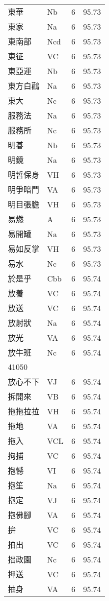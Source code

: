 \documentclass[twocolumn]{book}
\begin{document}
\begin{supertabular}{llrr}
東華 & Nb & 6 &  95.73\\
東家 & Na & 6 &  95.73\\
東南部 & Ncd & 6 &  95.73\\
東征 & VC & 6 &  95.73\\
東亞運 & Nb & 6 &  95.73\\
東方白鸛 & Na & 6 &  95.73\\
東大 & Nc & 6 &  95.73\\
服務法 & Na & 6 &  95.73\\
服務所 & Nc & 6 &  95.73\\
明碁 & Nb & 6 &  95.73\\
明鏡 & Na & 6 &  95.73\\
明哲保身 & VH & 6 &  95.73\\
明爭暗鬥 & VA & 6 &  95.73\\
明目張膽 & VH & 6 &  95.73\\
易燃 & A & 6 &  95.73\\
易開罐 & Na & 6 &  95.73\\
易如反掌 & VH & 6 &  95.73\\
易水 & Nc & 6 &  95.73\\
於是乎 & Cbb & 6 &  95.74\\
放養 & VC & 6 &  95.74\\
放送 & VC & 6 &  95.74\\
放射狀 & Na & 6 &  95.74\\
放光 & VA & 6 &  95.74\\
放牛班 & Nc & 6 &  95.74\\
41050\\
放心不下 & VJ & 6 &  95.74\\
拆開來 & VB & 6 &  95.74\\
拖拖拉拉 & VH & 6 &  95.74\\
拖地 & VA & 6 &  95.74\\
拖入 & VCL & 6 &  95.74\\
拘捕 & VC & 6 &  95.74\\
抱憾 & VI & 6 &  95.74\\
抱笙 & Na & 6 &  95.74\\
抱定 & VJ & 6 &  95.74\\
抱佛腳 & VA & 6 &  95.74\\
拚 & VC & 6 &  95.74\\
拍出 & VC & 6 &  95.74\\
拙政園 & Nc & 6 &  95.74\\
押送 & VC & 6 &  95.74\\
抽身 & VA & 6 &  95.74\\

\end{supertabular}
\end{document}
